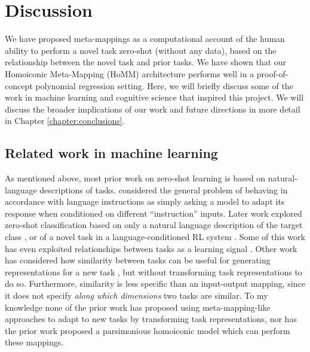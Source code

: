 \section{Discussion}\label{sec:HoMM:discussion}

We have proposed meta-mappings as a computational account of the human ability to perform a novel task zero-shot (without any data), based on the relationship between the novel task and prior tasks. We have shown that our Homoiconic Meta-Mapping (HoMM) architecture performs well in a proof-of-concept polynomial regression setting. Here, we will briefly discuss some of the work in machine learning and cognitive science that inspired this project. We will discuss the broader implications of our work and future directions in more detail in Chapter \ref{chapter:conclusions}. 

\subsection{Related work in machine learning}
As mentioned above, most prior work on zero-shot learning is based on natural-language descriptions of tasks. \citet{Larochelle2008} considered the general problem of behaving in accordance with language instructions as simply asking a model to adapt its response when conditioned on different ``instruction'' inputs. Later work explored zero-shot classification based on only a natural language description of the target class \citep{Socher2013,Romera-Paredes2015,Xian2018}, or of a novel task in a language-conditioned RL system \citep{Hermann2017, Hill2019a}. Some of this work has even exploited relationships between tasks as a learning signal \citep{Oh2017a}. Other work has considered how similarity between tasks can be useful for generating representations for a new task \citep{Pal2019}, but without transforming task representations to do so. Furthermore, similarity is less specific than an input-output mapping, since it does not specify \emph{along which dimensions} two tasks are similar. To my knowledge none of the prior work has proposed using meta-mapping-like approaches to adapt to new tasks by transforming task representations, nor has the prior work proposed a parsimonious homoiconic model which can perform these mappings.

